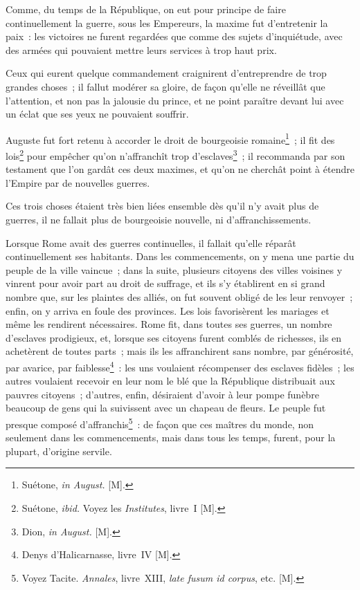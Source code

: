 \documentclass[french,twoside]{book} %
\begin{document}
Comme, du temps de la République, on eut pour principe de faire continuellement la guerre, sous les Empereurs, la maxime fut d’entretenir la paix : les victoires ne furent regardées que comme des sujets d’inquiétude, avec des armées qui pouvaient mettre leurs services à trop haut prix.\par
Ceux qui eurent quelque commandement craignirent d’entreprendre de trop grandes choses ; il fallut modérer sa gloire, de façon qu’elle ne réveillât que l’attention, et non pas la jalousie du prince, et ne point paraître devant lui avec un éclat que ses yeux ne pouvaient souffrir.\par
Auguste fut fort retenu à accorder le droit de bourgeoisie romaine\footnote{Suétone, {\itshape in August.} [M].} ; il fit des lois\footnote{Suétone, {\itshape ibid.} Voyez les {\itshape Institutes}, livre I [M].} pour empêcher qu’on n’affranchît trop d’esclaves\footnote{Dion, {\itshape in August.} [M].} ; il recommanda par son testament que l’on gardât ces deux maximes, et qu’on ne cherchât point à étendre l’Empire par de nouvelles guerres.\par
Ces trois choses étaient très bien liées ensemble dès qu’il n’y avait plus de guerres, il ne fallait plus de bourgeoisie nouvelle, ni d’affranchissements.\par
Lorsque Rome avait des guerres continuelles, il fallait qu’elle réparât continuellement ses habitants. Dans les commencements, on y mena une partie du peuple de la ville vaincue ; dans la suite, plusieurs citoyens des villes voisines y vinrent pour avoir part au droit de suffrage, et ils s’y établirent en si grand nombre que, sur les plaintes des alliés, on fut souvent obligé de les leur renvoyer ; enfin, on y arriva en foule des provinces. Les lois favorisèrent les mariages et même les rendirent nécessaires. Rome fit, dans toutes ses guerres, un nombre d’esclaves prodigieux, et, lorsque ses citoyens furent comblés de richesses, ils en achetèrent de toutes parts ; mais ils les affranchirent sans nombre, par générosité, par avarice, par faiblesse\footnote{Denys d’Halicarnasse, livre IV [M].} : les uns voulaient récompenser des esclaves fidèles ; les autres voulaient recevoir en leur nom le blé que la République distribuait aux pauvres citoyens ; d’autres, enfin, désiraient d’avoir à leur pompe funèbre beaucoup de gens qui la suivissent avec un chapeau de fleurs. Le peuple fut presque composé d’affranchis\footnote{Voyez Tacite. {\itshape Annales}, livre XIII, {\itshape late fusum id corpus}, etc. [M].} : de façon que ces maîtres du monde, non seulement dans les commencements, mais dans tous les temps, furent, pour la plupart, d’origine servile.\par
\end{document}
